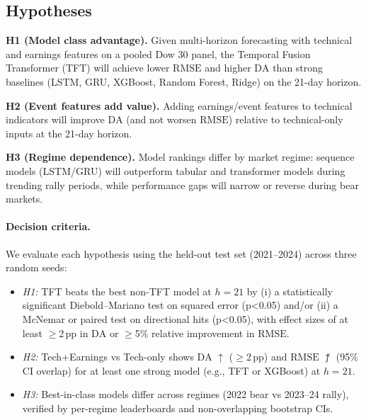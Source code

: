 \documentclass[10pt,twocolumn]{article}
\newcommand{\rmse}{\ensuremath{\mathrm{RMSE}}}
\newcommand{\da}{\ensuremath{\mathrm{DA}}}
\begin{document}
\subsection*{Hypotheses}

\textbf{H1 (Model class advantage).} Given multi-horizon forecasting with technical and earnings features on a pooled Dow 30 panel, the Temporal Fusion Transformer (TFT) will achieve lower \rmse{} and higher \da{} than strong baselines (LSTM, GRU, XGBoost, Random Forest, Ridge) on the 21-day horizon.

\textbf{H2 (Event features add value).} Adding earnings/event features to technical indicators will improve \da{} (and not worsen \rmse{}) relative to technical-only inputs at the 21-day horizon.

\textbf{H3 (Regime dependence).} Model rankings differ by market regime: sequence models (LSTM/GRU) will outperform tabular and transformer models during trending rally periods, while performance gaps will narrow or reverse during bear markets.

\paragraph{Decision criteria.}
We evaluate each hypothesis using the held-out test set (2021--2024) across three random seeds:
\begin{itemize}
  \item \textit{H1:} TFT beats the best non-TFT model at $h{=}21$ by (i) a statistically significant Diebold--Mariano test on squared error (p{<}0.05) and/or (ii) a McNemar or paired test on directional hits (p{<}0.05), with effect sizes of at least $\geq$2\,pp in \da{} or $\geq$5\% relative improvement in \rmse{}.
  \item \textit{H2:} Tech{+}Earnings vs Tech-only shows \da{} $\uparrow$ ($\geq$2\,pp) and \rmse{} $\not\uparrow$ (95\% CI overlap) for at least one strong model (e.g., TFT or XGBoost) at $h{=}21$.
  \item \textit{H3:} Best-in-class models differ across regimes (2022 bear vs 2023--24 rally), verified by per-regime leaderboards and non-overlapping bootstrap CIs.
\end{itemize}
\end{document}

